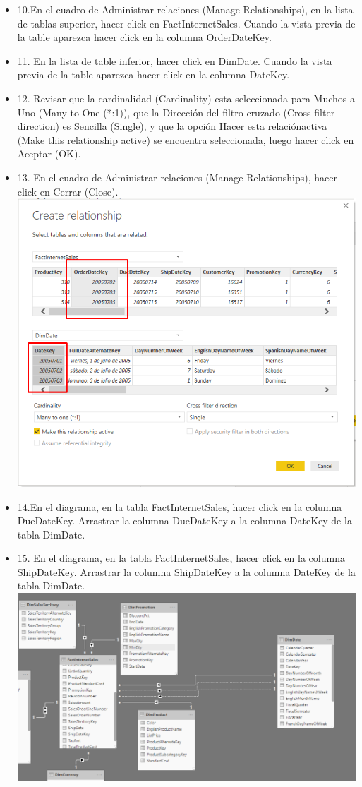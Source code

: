 \begin{itemize}
\item 10.En el cuadro de Administrar relaciones (Manage Relationships), en la lista de tablas superior, hacer click en FactInternetSales. Cuando la vista previa de la table aparezca hacer click en la columna OrderDateKey.
\item 11. En la lista de table inferior, hacer click en DimDate. Cuando la vista previa de la table aparezca hacer click en la columna DateKey.
\item 12. Revisar que la cardinalidad (Cardinality) esta seleccionada para Muchos a Uno (Many to One (*:1)), que la Dirección del filtro cruzado (Cross filter direction) es Sencilla (Single), y que la opción Hacer esta relaciónactiva (Make this relationship active) se encuentra seleccionada, luego hacer click en Aceptar (OK).
\item 13. En el cuadro de Administrar relaciones (Manage Relationships), hacer click en Cerrar (Close). \\
\includegraphics[scale=0.5]{./Imagenes/image004}
\item 14.En el diagrama, en la tabla FactInternetSales, hacer click en la columna DueDateKey. Arrastrar la columna DueDateKey a la columna DateKey de la tabla DimDate.
\item 15. En el diagrama, en la tabla FactInternetSales, hacer click en la columna ShipDateKey. Arrastrar la columna ShipDateKey a la columna DateKey de la tabla DimDate. \\
\includegraphics[scale=0.5]{./Imagenes/image005}

\end{itemize}
